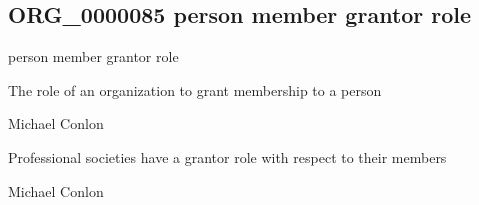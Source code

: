 \documentclass[letterpaper,10pt,english]{sphinxmanual}
\begin{document}
\subsection{ORG\_0000085 \sphinxhyphen{} person member grantor role}
\label{\detokenize{doc-ORG_0000085:org-0000085-person-member-grantor-role}}\label{\detokenize{doc-ORG_0000085:index-0}}\label{\detokenize{doc-ORG_0000085::doc}}
\begin{sphinxShadowBox}

\sphinxAtStartPar
person member grantor role
\end{sphinxShadowBox}

\begin{sphinxShadowBox}

\sphinxAtStartPar
{\hyperref[\detokenize{doc-BFO_0000023::doc}]{}}
\end{sphinxShadowBox}

\begin{sphinxShadowBox}

\sphinxAtStartPar
The role of an organization to grant membership to a person
\end{sphinxShadowBox}

\begin{sphinxShadowBox}

\sphinxAtStartPar
Michael Conlon 
\end{sphinxShadowBox}

\begin{sphinxShadowBox}

\sphinxAtStartPar
Professional societies have a grantor role with respect to their members
\end{sphinxShadowBox}

\begin{sphinxShadowBox}

\sphinxAtStartPar
Michael Conlon 
\end{sphinxShadowBox}
\begin{quote}

\ignorespaces \end{quote}
\end{document}
